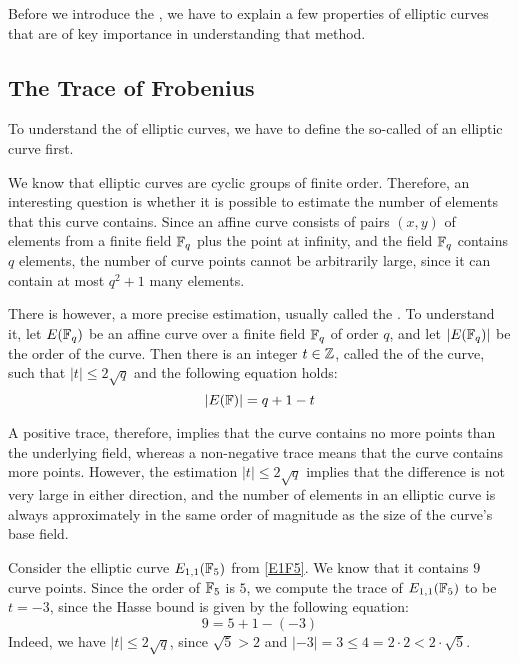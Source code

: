 Before we introduce the , we have to explain a few properties of elliptic curves that are of key importance in understanding that method. 

\subsection{The Trace of Frobenius} To understand the  of elliptic curves, we have to define the so-called  of an elliptic curve first.

We know that elliptic curves are cyclic groups of finite order. Therefore, an interesting question is whether it is possible to estimate the number of elements that this curve contains. Since an affine  curve consists of pairs $(x,y)$ of elements from a finite field $\mathbb{F}_q$ plus the point at infinity, and the field $\mathbb{F}_q$ contains $q$ elements, the number of curve points cannot be arbitrarily large, since it can contain at most $q^2+1$ many elements. 

There is however, a more precise estimation, usually called the . To understand it, let $E(\mathbb{F}_q)$ be an affine  curve over a finite field $\mathbb{F}_q$ of order $q$, and let $|E(\mathbb{F}_q)|$ be the order of the curve. Then there is an integer $t\in \mathbb{Z}$, called the  of the curve, such that $|t| \leq 2\sqrt{q}$ and the following equation holds:
\begin{equation}\label{hasse-bound}
|E(\mathbb{F})| = q +1 -t
\end{equation}

A positive trace, therefore, implies that the curve contains no more points than the underlying field, whereas a non-negative trace means that the curve contains more points. However, the estimation $|t| \leq 2\sqrt{q}$ implies that the difference is not very large in either direction, and the number of elements in an elliptic curve is always approximately in the same order of magnitude as the size of the curve's base field.

\begin{example}\label{ex:E1F5-frobenius} Consider the elliptic curve $E_{1,1}(\mathbb{F}_5)$ from \examplename{} \ref{E1F5}. We know that it contains $9$ curve points. Since the order of $\mathbb{F}_5$ is $5$, we compute the trace of $E_{1,1}(\mathbb{F}_5)$ to be $t=-3$, since the Hasse bound is given by the following equation:
$$
9 = 5 + 1 - (-3)
$$
Indeed, we have $|t| \leq 2\sqrt{q}$, since $\sqrt{5}> 2$ and 
$|-3|= 3 \leq 4 = 2\cdot 2< 2\cdot \sqrt{5}$.
\end{example}


